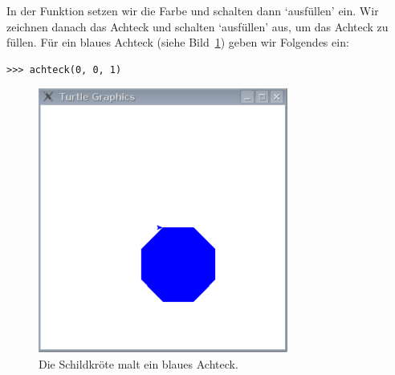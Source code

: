 In der Funktion setzen wir die Farbe und schalten dann `ausfüllen' ein. Wir zeichnen danach das Achteck und schalten `ausfüllen' aus, um das Achteck zu füllen. Für ein blaues Achteck (siehe Bild~\ref{fig49}) geben wir Folgendes ein:

\begin{Verbatim}[frame=single]
>>> achteck(0, 0, 1)
\end{Verbatim}

\begin{figure}
\begin{center}
\includegraphics[width=82mm]{images/figure49}
\end{center}
\caption{Die Schildkröte malt ein blaues Achteck.}\label{fig49}
\end{figure}
\newpage
